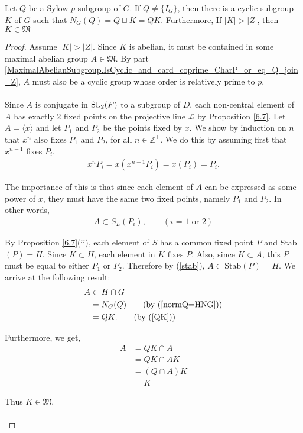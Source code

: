 \begin{theorem}
  \label{MaximalAbelianSubgroup.K_mem_MaximalAbelianSubgroups_of_center_lt_card_K}
  Let $Q$ be a Sylow $p$-subgroup of $G$. If $Q \neq \{I_G\}$, then there is a cyclic subgroup $K$ of $G$ such that $N_G(Q) = Q \sqcup K = QK$. Furthermore, If $|K| > |Z|$, then $K \in \mathfrak{M}$
\end{theorem}
\begin{proof} 
Assume $|K| > |Z|$. Since $K$ is abelian, it must be contained in some maximal abelian group $A \in \mathfrak{M}$. By part \ref{MaximalAbelianSubgroup.IsCyclic_and_card_coprime_CharP_or_eq_Q_join_Z}, $A$ must also be a cyclic group whose order is relatively prime to $p$. \\
\\
Since $A$ is conjugate in $\operatorname{SL}_2(F)$ to a subgroup of $D$, each non-central element of $A$ has exactly 2 fixed points on the projective line $\mathscr{L}$ by Proposition \ref{6.7}. Let $A = \langle x \rangle$ and let $P_1$ and $P_2$ be the points fixed by $x$. We show by induction on $n$ that $x^n$ also fixes $P_1$ and $P_2$, for all $n \in \mathbb{Z^+}$. We do this by assuming first that $x^{n-1}$ fixes $P_i$.
\begin{align*} x^n P_i = x(x^{n-1} P_i) = x (P_i) = P_i.
\end{align*}

The importance of this is that since each element of $A$ can be expressed as some power of $x$, they must have the same two fixed points, namely $P_1$ and $P_2$. In other words, 
\begin{align}\label{stab} A \subset S_L(P_i), \qquad (\text{$i$ = 1 or 2})
\end{align}

By Proposition \ref{6.7}(ii), each element of $S$ has a common fixed point $P$ and Stab$(P) = H$. Since $K \subset H$, each element in $K$ fixes $P$. Also, since $K \subset A$, this $P$ must be equal to either $P_1$ or $P_2$. Therefore by (\ref{stab}), $A \subset \text{Stab}(P) = H$. We arrive at the following result:
\begin{align*} A &\subset H \cap G 
\\ &= N_G(Q) \tag{by (\ref{normQ=HNG})}
\\ &= QK. \tag{by (\ref{QK})}
\end{align*}

Furthermore, we get,
\begin{align*} A &= QK \cap A
\\ &= QK \cap AK \tag{$K \subset A$ so $A = AK$}
\\ &= (Q \cap A)K
\\ &= K \tag{$Q \cap A = I_G$}
\end{align*}

Thus $K \in \mathfrak{M}$.\\
\\
\end{proof}
